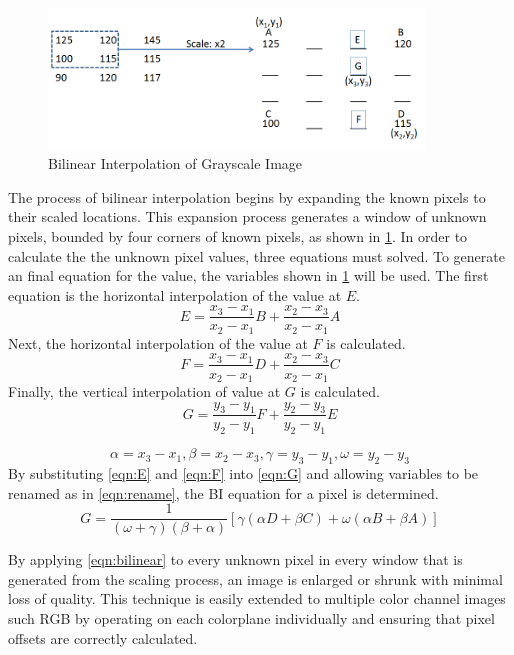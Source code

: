 \begin{figure}
  \centering
  \includegraphics[width=10cm]{./img/bilinear_example.PNG}
  \caption{Bilinear Interpolation of Grayscale Image}
  \label{fig:bilinearExample}
\end{figure}
The process of bilinear interpolation begins by expanding the known pixels to their scaled locations.  This expansion process generates a window of unknown pixels, bounded by four corners of known pixels, as shown in \ref{fig:bilinearExample}.  In order to calculate the the unknown pixel values, three equations must solved.  To generate an final equation for the value, the variables shown in \ref{fig:bilinearExample} will be used.  The first equation is the horizontal interpolation of the value at $E$.
\begin{equation}
  E = \frac{x_3-x_1}{x_2-x_1}B + \frac{x_2-x_3}{x_2-x_1}A
  \label{eqn:E}
\end{equation}
Next, the horizontal interpolation of the value at $F$ is calculated.
\begin{equation}
  F = \frac{x_3-x_1}{x_2-x_1}D + \frac{x_2-x_3}{x_2-x_1}C
  \label{eqn:F}
\end{equation}
Finally, the vertical interpolation of value at $G$ is calculated.
\begin{equation}
  G = \frac{y_3-y_1}{y_2-y_1}F + \frac{y_2-y_3}{y_2-y_1}E
  \label{eqn:G}
\end{equation}

\begin{equation}
  \alpha = x_3 - x_1, 
  \beta = x_2 - x_3, 
  \gamma = y_3 - y_1, 
  \omega = y_2 - y_3
  \label{eqn:rename}
\end{equation}
By substituting \eqref{eqn:E} and \eqref{eqn:F} into \eqref{eqn:G} and allowing variables to be renamed as in \eqref{eqn:rename}, the BI equation for a pixel is determined.
\begin{equation}
  G = \frac{1}{(\omega + \gamma)(\beta + \alpha)}[\gamma(\alpha D + \beta C) + \omega(\alpha B + \beta A)]
  \label{eqn:bilinear}
\end{equation}

By applying \eqref{eqn:bilinear} to every unknown pixel in every window that is generated from the scaling process, an image is enlarged or shrunk with minimal loss of quality.  This technique is easily extended to multiple color channel images such RGB by operating on each colorplane individually and ensuring that pixel offsets are correctly calculated.
